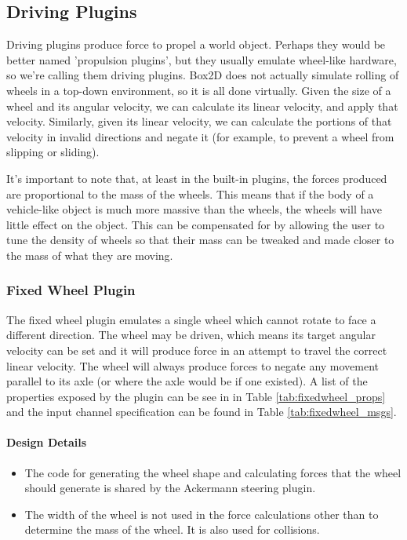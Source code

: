 \begin{itemize}
\subsection{Driving Plugins}
Driving plugins produce force to propel a world object. Perhaps they would be better named 'propulsion plugins', but they usually emulate wheel-like hardware, so we're calling them driving plugins. Box2D does not actually simulate rolling of wheels in a top-down environment, so it is all done virtually. Given the size of a wheel and its angular velocity, we can calculate its linear velocity, and apply that velocity. Similarly, given its linear velocity, we can calculate the portions of that velocity in invalid directions and negate it (for example, to prevent a wheel from slipping or sliding).

It's important to note that, at least in the built-in plugins, the forces produced are proportional to the mass of the wheels. This means that if the body of a vehicle-like object is much more massive than the wheels, the wheels will have little effect on the object. This can be compensated
for by allowing the user to tune the density of wheels so that their mass
can be tweaked and made closer to the mass of what they are moving.

\subsubsection*{Fixed Wheel Plugin}
The fixed wheel plugin emulates a single wheel which cannot rotate to face a different direction. The wheel may be driven, which means its target angular velocity can be set and it will produce force in an attempt to travel the correct linear velocity. The wheel will always produce forces to negate any movement parallel to its axle (or where the axle would be if one existed). A list of the properties exposed by the plugin can be see in in Table \ref{tab:fixedwheel_props} and the input channel specification can be found in Table \ref{tab:fixedwheel_msgs}.
\paragraph{Design Details}
\begin{itemize}
\item The code for generating the wheel shape and calculating forces that the wheel should generate is shared by the Ackermann steering plugin.
\item The width of the wheel is not used in the force calculations other than to determine the mass of the wheel. It is also used for collisions.
\end{itemize}


\end{itemize}
